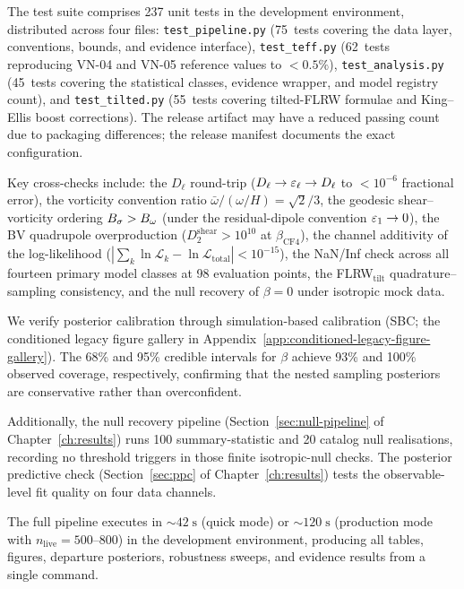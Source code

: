 The test suite comprises 237 unit tests in the development
environment, distributed across four
files: \texttt{test\_pipeline.py} (75~tests covering the data
layer, conventions, bounds, and evidence interface),
\texttt{test\_teff.py} (62~tests reproducing VN-04 and VN-05
reference values to $< 0.5\%$),
\texttt{test\_analysis.py}
(45~tests covering the statistical classes, evidence wrapper,
and model registry count), and
\texttt{test\_tilted.py} (55~tests covering tilted-FLRW
formulae and King--Ellis boost corrections).
The release artifact may have a reduced passing count
due to packaging differences; the release manifest
documents the exact configuration.

Key cross-checks include: the $D_\ell$ round-trip
($D_\ell \to \varepsilon_\ell \to D_\ell$ to $< 10^{-6}$ fractional
error), the vorticity convention ratio
$\bar{\omega}/(\omega/H) = \sqrt{2}/3$, the geodesic shear--vorticity
ordering $B_\sigma > B_\omega$ (under the residual-dipole convention
$\varepsilon_1 \to 0$), the BV
quadrupole overproduction ($D_2^{\mathrm{shear}} > 10^{10}$ at
$\beta_{\mathrm{CF4}}$), the channel additivity of the
log-likelihood ($|\sum_k \ln\mathcal{L}_k -
\ln\mathcal{L}_{\mathrm{total}}| < 10^{-15}$), the
NaN/Inf check across all fourteen primary model classes at 98 evaluation
points, the FLRW$_\mathrm{tilt}$ quadrature--sampling
consistency, and the null recovery of $\beta = 0$ under
isotropic mock data.

We verify posterior calibration through simulation-based calibration
(SBC; the conditioned legacy figure gallery in Appendix~\ref{app:conditioned-legacy-figure-gallery}).  The 68\% and 95\% credible
intervals for $\beta$ achieve 93\% and 100\% observed coverage,
respectively, confirming that the nested sampling posteriors are
conservative rather than overconfident.

Additionally, the null recovery pipeline
(Section~\ref{sec:null-pipeline} of Chapter~\ref{ch:results})
runs 100 summary-statistic and 20 catalog null realisations,
recording no threshold triggers in those finite isotropic-null
checks.
The posterior predictive check
(Section~\ref{sec:ppc} of Chapter~\ref{ch:results}) tests
the observable-level fit quality on four data channels.

The full pipeline executes in $\sim 42\;\mathrm{s}$ (quick mode)
or $\sim 120\;\mathrm{s}$ (production mode with
$n_{\mathrm{live}} = 500$--$800$) in the development environment,
producing all tables, figures,
departure posteriors, robustness sweeps, and evidence results
from a single command.

